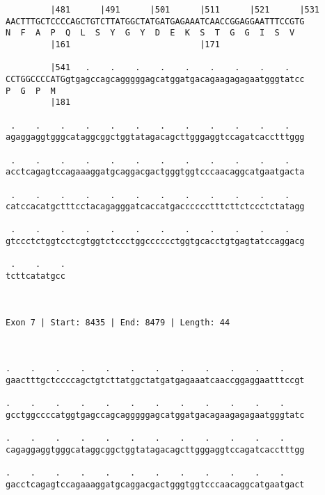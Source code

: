 \documentclass{article}
\begin{document}
\begin{Verbatim}
         |481      |491      |501      |511      |521      |531
AACTTTGCTCCCCAGCTGTCTTATGGCTATGATGAGAAATCAACCGGAGGAATTTCCGTG
N  F  A  P  Q  L  S  Y  G  Y  D  E  K  S  T  G  G  I  S  V  
         |161                          |171                 
  
         |541   .    .    .    .    .    .    .    .    .   
CCTGGCCCCATGgtgagccagcagggggagcatggatgacagaagagagaatgggtatcc
P  G  P  M                                                  
         |181                                               
  
 .    .    .    .    .    .    .    .    .    .    .    .   
agaggaggtgggcataggcggctggtatagacagcttgggaggtccagatcacctttggg
                                                            
 .    .    .    .    .    .    .    .    .    .    .    .   
acctcagagtccagaaaggatgcaggacgactgggtggtcccaacaggcatgaatgacta
                                                            
 .    .    .    .    .    .    .    .    .    .    .    .   
catccacatgctttcctacagagggatcaccatgacccccctttcttctccctctatagg
                                                            
 .    .    .    .    .    .    .    .    .    .    .    .   
gtccctctggtcctcgtggtctccctggcccccctggtgcacctgtgagtatccaggacg
                                                            
 .    .    .
tcttcatatgcc
            
            
 
Exon 7 | Start: 8435 | End: 8479 | Length: 44



.    .    .    .    .    .    .    .    .    .    .    .    
gaactttgctccccagctgtcttatggctatgatgagaaatcaaccggaggaatttccgt
                                                            
.    .    .    .    .    .    .    .    .    .    .    .    
gcctggccccatggtgagccagcagggggagcatggatgacagaagagagaatgggtatc
                                                            
.    .    .    .    .    .    .    .    .    .    .    .    
cagaggaggtgggcataggcggctggtatagacagcttgggaggtccagatcacctttgg
                                                            
.    .    .    .    .    .    .    .    .    .    .    .    
gacctcagagtccagaaaggatgcaggacgactgggtggtcccaacaggcatgaatgact
                                                            

\end{Verbatim}
\end{document}
